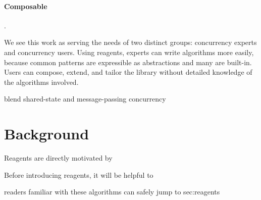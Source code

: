 \documentclass[preprint]{sigplanconf}
\newcommand{\elide}[1]{}
\begin{document}
\paragraph{Composable} .

We see this work as serving the needs of two distinct groups: concurrency
experts and concurrency users.  Using reagents, experts can write algorithms
more easily, because common patterns are expressible as abstractions and many
are built-in.  Users can compose, extend, and tailor the library without
detailed knowledge of the algorithms involved.

blend shared-state and message-passing concurrency


\elide{
# Contributions

  - make it easier to express fine-grained concurrent algorithms,
  including blocking operations etc.  make it possible to build them
  compositionally, which already happens in the literature but is
  largely unremarked upon.

  - we capture exponential backoff, elimination backoff, and other
  such patterns once and for all

  - can use flat combining as illustration of capturing very general
  concurrency abstraction

  - smooth blend of message-passing and shared-state concurrency
  isolation for shared state, coherent communication through messages,
  uniform blocking/synchronization

  - operational semantics

  - yields completely lock-free implementation of core CML

  - generalizes join calculus implementation, allowing dissolution
  even for existing channels

  - generalizes transactional events, but with more specialized
  implementation (doesn't need an underlying STM)

by no means a silver bullet.

why is this different from STM
}

\section{Background}

Reagents are directly motivated by 

Before introducing reagents, it will be helpful to 

readers familiar with these algorithms can safely jump to sec:reagents
\end{document}
